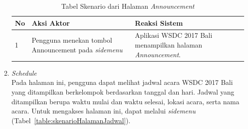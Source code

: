 \begin{enumerate}
		\begin{table}[H]
			\centering
			\begin{tabular}{|p{0.5cm}|p{7cm}|p{7cm}|}
				\hline
				No & Aksi Aktor                               & Reaksi Sistem                                          \\ \hline
				1  & Pengguna menekan tombol Announcement pada \textit{sidemenu} & Aplikasi WSDC 2017 Bali menampilkan halaman \textit{Announcement}. \\ \hline
			\end{tabular}
			\caption{Tabel Skenario dari Halaman \textit{Announcement}}
			\label{table:skenarioHalamanPemberitahuan}
		\end{table}
	\item \textit{Schedule} \\ 
	Pada halaman ini, pengguna dapat melihat jadwal acara WSDC 2017 Bali yang ditampilkan berkelompok berdasarkan tanggal dan hari. Jadwal yang ditampilkan berupa waktu mulai dan waktu selesai, lokasi acara, serta nama acara. Untuk mengakses halaman ini, dapat melalui \textit{sidemenu} (Tabel~\ref{table:skenarioHalamanJadwal}).

\end{enumerate}
